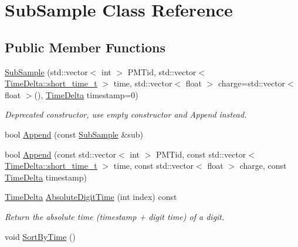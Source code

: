 \hypertarget{classSubSample}{\section{Sub\-Sample Class Reference}
\label{classSubSample}
}
\subsection*{Public Member Functions}
\begin{DoxyCompactItemize}
\item 
\hypertarget{classSubSample_a56eeea67b7852ab8a2c5682f908abc93}{\hyperlink{classSubSample_a56eeea67b7852ab8a2c5682f908abc93}{Sub\-Sample} (std\-::vector$<$ int $>$ P\-M\-Tid, std\-::vector$<$ \hyperlink{classTimeDelta_afe4b7adde6a0645a8ada61f39e198c8e}{Time\-Delta\-::short\-\_\-time\-\_\-t} $>$ time, std\-::vector$<$ float $>$ charge=std\-::vector$<$ float $>$(), \hyperlink{classTimeDelta}{Time\-Delta} timestamp=0)}\label{classSubSample_a56eeea67b7852ab8a2c5682f908abc93}

\begin{DoxyCompactList}\small\item\em Deprecated constructor, use empty constructor and Append instead. \end{DoxyCompactList}\item 
bool \hyperlink{classSubSample_abc19e029b849c88e4a605327a1ba7816}{Append} (const \hyperlink{classSubSample}{Sub\-Sample} \&sub)
\item 
bool \hyperlink{classSubSample_abbb16914eb71ed96e07fc065c77a61a2}{Append} (const std\-::vector$<$ int $>$ P\-M\-Tid, const std\-::vector$<$ \hyperlink{classTimeDelta_afe4b7adde6a0645a8ada61f39e198c8e}{Time\-Delta\-::short\-\_\-time\-\_\-t} $>$ time, const std\-::vector$<$ float $>$ charge, const \hyperlink{classTimeDelta}{Time\-Delta} timestamp)
\item 
\hypertarget{classSubSample_ae2e236965be0457c1374947774436be8}{\hyperlink{classTimeDelta}{Time\-Delta} \hyperlink{classSubSample_ae2e236965be0457c1374947774436be8}{Absolute\-Digit\-Time} (int index) const }\label{classSubSample_ae2e236965be0457c1374947774436be8}

\begin{DoxyCompactList}\small\item\em Return the absolute time (timestamp + digit time) of a digit. \end{DoxyCompactList}\item 
\hypertarget{classSubSample_a3af7256b98eb7eb10d748fe136e40f87}{void \hyperlink{classSubSample_a3af7256b98eb7eb10d748fe136e40f87}{Sort\-By\-Time} ()}\label{classSubSample_a3af7256b98eb7eb10d748fe136e40f87}


\end{DoxyCompactItemize}
